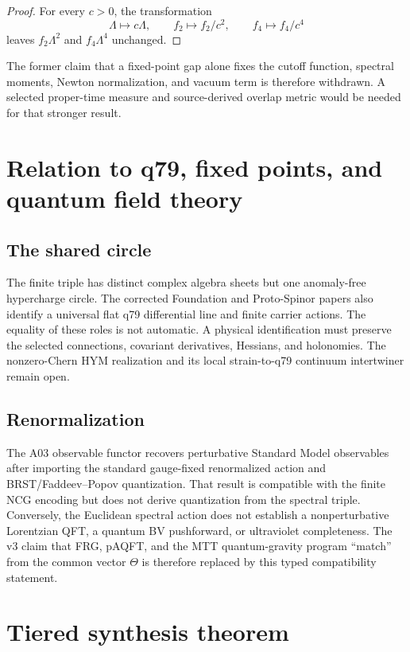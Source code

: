 \documentclass[11pt,a4paper,twoside]{article}
\theoremstyle{plain}
\theoremstyle{definition}
\theoremstyle{remark}
\begin{document}
\begin{proof}
For every $c>0$, the transformation
\[
 \Lambda\mapsto c\Lambda,\qquad
 f_2\mapsto f_2/c^2,\qquad
 f_4\mapsto f_4/c^4
\]
leaves $f_2\Lambda^2$ and $f_4\Lambda^4$ unchanged.
\end{proof}

The former claim that a fixed-point gap alone fixes the cutoff function,
spectral moments, Newton normalization, and vacuum term is therefore
withdrawn.  A selected proper-time measure and source-derived overlap metric
would be needed for that stronger result.

\section{Relation to q79, fixed points, and quantum field theory}

\subsection{The shared circle}

The finite triple has distinct complex algebra sheets but one anomaly-free
hypercharge circle.  The corrected Foundation and Proto-Spinor papers also
identify a universal flat q79 differential line and finite carrier actions.
The equality of these roles is not automatic.  A physical identification
must preserve the selected connections, covariant derivatives, Hessians, and
holonomies.  The nonzero-Chern HYM realization and its local
strain-to-q79 continuum intertwiner remain open.

\subsection{Renormalization}

The A03 observable functor recovers perturbative Standard Model observables
after importing the standard gauge-fixed renormalized action and
BRST/Faddeev--Popov quantization.  That result is compatible with the finite
NCG encoding but does not derive quantization from the spectral triple.
Conversely, the Euclidean spectral action does not establish a
nonperturbative Lorentzian QFT, a quantum BV pushforward, or ultraviolet
completeness.  The v3 claim that FRG, pAQFT, and the MTT quantum-gravity
program ``match'' from the common vector $\Theta$ is therefore replaced by
this typed compatibility statement.

\section{Tiered synthesis theorem}
\end{document}
